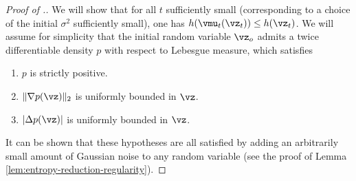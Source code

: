 \documentclass[../../book-main.tex]{subfiles}
\begin{document}
\begin{proof}[Proof of {}.]
  We will show that for all $t$ sufficiently small (corresponding to a choice of
  the initial $\sigma^2$ sufficiently small), one has $h(\vmu_t(\vz_t)) \leq
  h(\vz_t)$.
  We will assume for simplicity that the initial random variable $\vz_o$ admits
  a twice differentiable density $p$ with respect to
  Lebesgue measure, which satisfies
  \begin{enumerate}[label={\arabic*.}]
    \item $p$ is strictly positive.
    \item $\| \nabla p(\vz) \|_2$ is uniformly bounded in $\vz$.
    \item $| \Delta p(\vz) |$ is uniformly bounded in $\vz$.
  \end{enumerate}
  It can be shown that these hypotheses are all satisfied by adding an
  arbitrarily small amount of Gaussian noise to any random variable (see the
  proof of Lemma \ref{lem:entropy-reduction-regularity}).


\end{proof}
\end{document}
